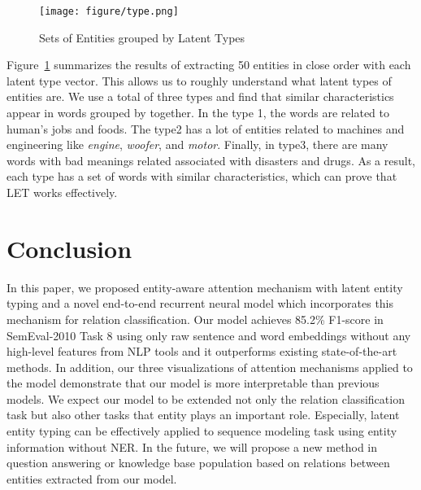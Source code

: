\documentclass[twoside,leqno,twocolumn]{article}
\begin{document}
\begin{figure}[!ht]
\texttt{[image: figure/type.png]}
\caption{Sets of Entities grouped by Latent Types}
\label{fig:type}
\end{figure}
Figure~\ref{fig:type} summarizes the results of extracting 50 entities in close order with each latent type vector.
This allows us to roughly understand what latent types of entities are.
We use a total of three types and find that similar characteristics appear in words grouped by together.
In the type 1, the words are related to human's jobs and foods.
The type2 has a lot of entities related to machines and engineering like \textit{engine}, \textit{woofer}, and \textit{motor}.
Finally, in type3, there are many words with bad meanings related associated with disasters and drugs.
As a result, each type has a set of words with similar characteristics, which can prove that LET works effectively.



\section{Conclusion}
In this paper, we proposed entity-aware attention mechanism with latent entity typing and a novel end-to-end recurrent neural model which incorporates this mechanism for relation classification.
Our model achieves 85.2\% F1-score in SemEval-2010 Task 8 using only raw sentence and word embeddings without any high-level features from NLP tools and it outperforms existing state-of-the-art methods.
In addition, our three visualizations of attention mechanisms applied to the model demonstrate that our model is more interpretable than previous models.
We expect our model to be extended not only the relation classification task but also other tasks that entity plays an important role.
Especially, latent entity typing can be effectively applied to sequence modeling task using entity information without NER.
In the future, we will propose a new method in question answering or knowledge base population based on relations between entities extracted from our model.




\end{document}
